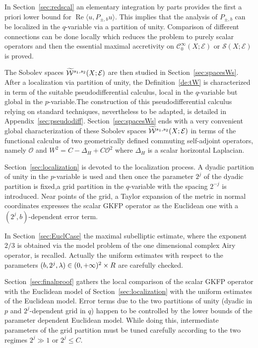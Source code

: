 \documentclass[10pt]{amsart}
\theoremstyle{definition}\newtheorem{defi}[theo]{Definition}\newtheorem{rema}[theo]{Remark}\newtheorem{exam}[theo]{Example}\newtheorem{exem}[theo]{Example}\newtheorem{nota}[theo]{Notation}
\newcommand{\clW}{\mathcal{W}}
\newcommand{\clC}{\mathcal{C}}
\newcommand{\clO}{\mathcal{O}}
\newcommand{\clE}{\mathcal{E}}
\newcommand{\clS}{\mathcal{S}}
\DeclareMathOperator{\Ree}{Re}
\let\oldtilde\tilde
\renewcommand*{\tilde}[1]{\mathchoice{\widetilde{#1}}{\widetilde{#1}}{\oldtilde{#1}}{\oldtilde{#1}}}
\begin{document}
In Section~\ref{sec:redscal} an elementary integration by parts provides the first a priori lower bound for $\Ree\langle u, P_{\pm,b}u\rangle$. This implies that the analysis of $P_{\pm,b}$ can be localized in the $q$-variable via a partition of unity. Comparison of different connections can be done locally which reduces the problem to purely scalar operators and then the essential maximal accretivity on $\clC^{\infty}_{0}(X;\clE)$ or $\clS(X;\clE)$ is proved.

The Sobolev spaces $\tilde{\clW}^{s_1,s_2}(X;\clE)$ are then studied in Section~{\ref{sec:spacesWs}}. After a localization via partition of unity, the Definition~\ref{de:tW} is characterized in term of the suitable pseudodifferential calculus, local in the $q$-variable but global in the $p$-variable.\linebreak The construction of this pseudodifferential calculus relying on standard techniques, nevertheless to be adapted, is detailed in Appendix~\ref{sec:pseudodiff}. Section~\ref{sec:spacesWs} ends with a very convenient global characterization of these Sobolev spaces $\tilde{\clW}^{s_1,s_2}(X;\clE)$ in terms of the functional calculus of two geometrically defined commuting self-adjoint operators, namely $\clO$ and $W^2=C-\Delta_H +C\clO^2$ where $\Delta_H$ is a scalar horizontal Laplacian.

Section~\ref{sec:localization} is devoted to the localization process. A dyadic partition of unity in the $p$-variable is used and then once the parameter $2^j$ of the dyadic partition is fixed,\linebreak a grid partition in the $q$-variable with the spacing $2^{-j}$ is introduced. Near points of the grid, a Taylor expansion of the metric in normal coordinates expresses the scalar GKFP operator as the Euclidean one with a $(2^j,b)$-dependent error term.

In Section~\ref{sec:EuclCase} the maximal subelliptic estimate, where the exponent $2/3$ is obtained via the model problem of the one dimensional complex Airy operator, is recalled. Actually the uniform estimates with respect to the parameters $(b,2^j,\lambda)\in\linebreak (0,+\infty)^2\times R$ are carefully checked.

Section~\ref{sec:finalproof} gathers the local comparison of the scalar GKFP operator with the Euclidean model of Section~\ref{sec:localization} with the uniform estimates of the Euclidean model. Error terms due to the two partitions of unity (dyadic in $p$ and $2^j$-dependent grid in $q$) happen to be controlled by the lower bounds of the parameter dependent Euclidean model. While doing this, intermediate parameters of the grid partition must be tuned carefully according to the two regimes $2^j\gg 1$ or $2^j\leq C$.
\end{document}
